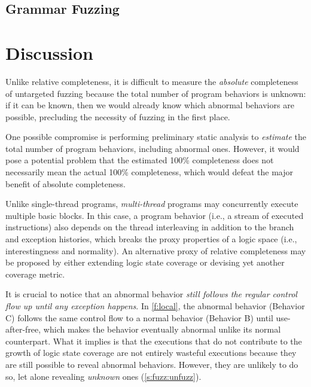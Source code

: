 \documentclass[letterpaper,twocolumn,10pt]{article}
\begin{document}

\subsection{Grammar Fuzzing}



\section{Discussion}
\label{s:disc}

%
Unlike relative completeness, it is difficult to measure the \emph{absolute}
completeness of untargeted fuzzing because the total number of program behaviors
is unknown: if it can be known, then we would already know which abnormal
behaviors are possible, precluding the necessity of fuzzing in the first place.

One possible compromise is performing preliminary static analysis to
\emph{estimate} the total number of program behaviors, including abnormal ones.
However, it would pose a potential problem that the estimated 100\% completeness
does not necessarily mean the actual 100\% completeness, which would defeat the
major benefit of absolute completeness.

%
Unlike single-thread programs, \emph{multi-thread} programs may concurrently
execute multiple basic blocks. In this case, a program behavior (i.e., a stream
of executed instructions) also depends on the thread interleaving in
addition to the branch and exception histories, which breaks the proxy
properties of a logic space (i.e., interestingness and normality).
An alternative proxy of relative completeness may be proposed by either
extending logic state coverage or devising yet another coverage metric.

%
It is crucial to notice that an abnormal behavior \emph{still follows the
regular control flow up until any exception happens}. In \autoref{f:local}, the
abnormal behavior (Behavior C) follows the same control flow to a normal
behavior (Behavior B) until use-after-free, which makes the behavior eventually
abnormal unlike its normal counterpart. 
%
What it implies is that the executions that do not contribute to the growth of
logic state coverage are not entirely wasteful executions because they are still
possible to reveal abnormal behaviors. However, they are unlikely to do so, let
alone revealing \emph{unknown} ones (\autoref{s:fuzz:unfuzz}).
\end{document}
